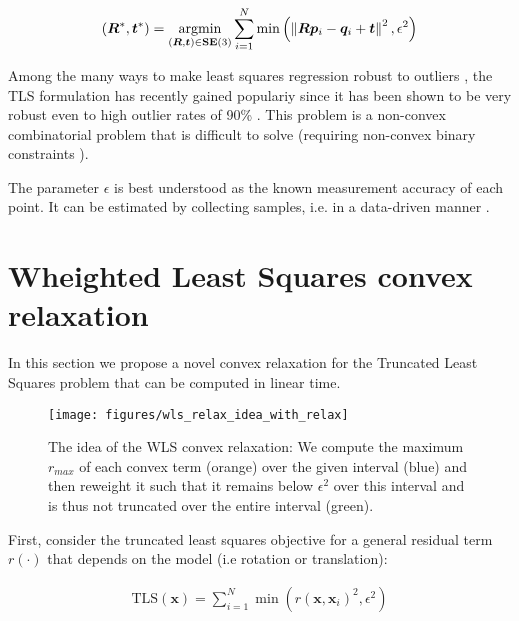 \begin{equation}
	\label{eq:pcr-tls}
	\begin{aligned}
		({\bm R}^*, \boldsymbol{t}^*) =  \operatorname*{argmin}_{({\bm R}, \boldsymbol{t}) \in \mathbf{SE(\textrm{3})}}  \sum_{i=1}^{N} \min \left(\left\|{\bm R} \boldsymbol{p}_i  - \boldsymbol{q}_i  + \boldsymbol{t}\right\|^2, \epsilon^2 \right)
	\end{aligned}
\end{equation}

Among the many ways to make least squares regression robust to outliers \cite[Ch. 3]{elements-of-stats-learning-book}, the TLS formulation has recently gained populariy \cite{Yang20tro-teaser, 9785843, NIPS2017_9f53d83e, doi:10.1080/10618600.2017.1390471, NIPS2010_01882513} since it has been shown to be very robust even to high outlier rates of 90\% \cite{Yang20tro-teaser}.
This problem is a non-convex combinatorial problem that is difficult to solve (requiring non-convex binary constraints \cite{5459398}).

The parameter $\epsilon$ is best understood as the known measurement accuracy of each point. It can be estimated by collecting samples, i.e. in a data-driven manner \cite[p.8]{Chin2017TheMC}.


\section{Wheighted Least Squares convex relaxation}

In this section we propose a novel convex relaxation for the Truncated Least Squares problem that can be computed in linear time.

\begin{figure}[!ht]
	\centering
	\texttt{[image: figures/wls\_relax\_idea\_with\_relax]}
	\caption{The idea of the WLS convex relaxation: We compute the maximum $r_{max}$ of each convex term (orange) over the given interval (blue) and then reweight it such that it remains below $\epsilon^2$ over this interval and is thus not truncated over the entire interval (green).}
	\label{fig:wlsrelaxideawithrelax}
\end{figure}

First, consider the truncated least squares objective for a general residual term $r(\cdot)$ that depends on the model (i.e rotation or translation): 

\begin{equation}
	\label{eq:tls-scalar-for-wls}
	\begin{aligned}
		\text{TLS}(\mathbf{x}) = \sum_{i=1}^{N} \min \left(r(\mathbf{x}, \mathbf{x}_i)^2, \epsilon^2 \right)\\
	\end{aligned}
\end{equation}

